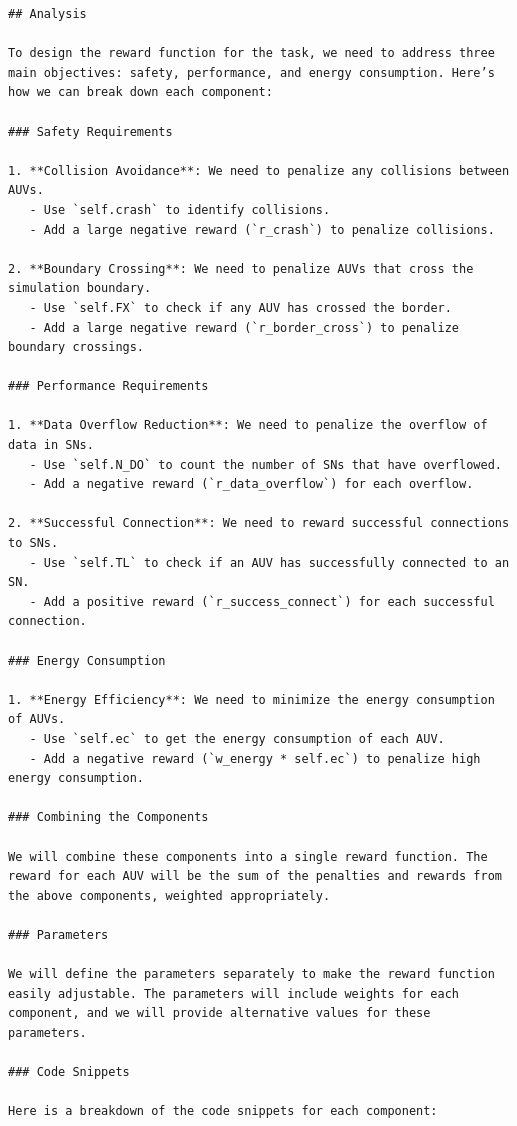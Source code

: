 \documentclass{article}
\begin{document}
\begin{verbatim}
## Analysis

To design the reward function for the task, we need to address three main objectives: safety, performance, and energy consumption. Here’s how we can break down each component:

### Safety Requirements

1. **Collision Avoidance**: We need to penalize any collisions between AUVs.
   - Use `self.crash` to identify collisions.
   - Add a large negative reward (`r_crash`) to penalize collisions.

2. **Boundary Crossing**: We need to penalize AUVs that cross the simulation boundary.
   - Use `self.FX` to check if any AUV has crossed the border.
   - Add a large negative reward (`r_border_cross`) to penalize boundary crossings.

### Performance Requirements

1. **Data Overflow Reduction**: We need to penalize the overflow of data in SNs.
   - Use `self.N_DO` to count the number of SNs that have overflowed.
   - Add a negative reward (`r_data_overflow`) for each overflow.

2. **Successful Connection**: We need to reward successful connections to SNs.
   - Use `self.TL` to check if an AUV has successfully connected to an SN.
   - Add a positive reward (`r_success_connect`) for each successful connection.

### Energy Consumption

1. **Energy Efficiency**: We need to minimize the energy consumption of AUVs.
   - Use `self.ec` to get the energy consumption of each AUV.
   - Add a negative reward (`w_energy * self.ec`) to penalize high energy consumption.

### Combining the Components

We will combine these components into a single reward function. The reward for each AUV will be the sum of the penalties and rewards from the above components, weighted appropriately.

### Parameters

We will define the parameters separately to make the reward function easily adjustable. The parameters will include weights for each component, and we will provide alternative values for these parameters.

### Code Snippets

Here is a breakdown of the code snippets for each component:


\end{verbatim}
\end{document}
